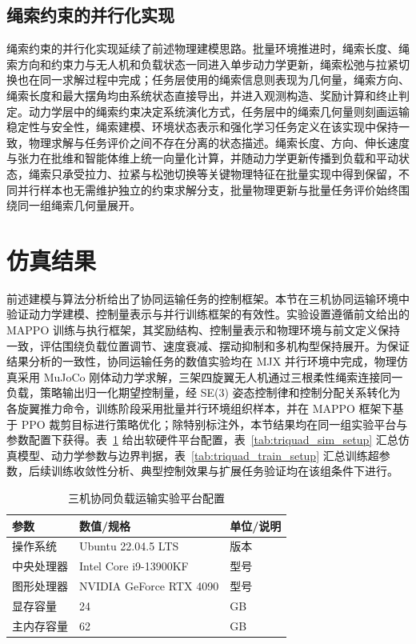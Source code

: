 \subsection{绳索约束的并行化实现}

绳索约束的并行化实现延续了前述物理建模思路。批量环境推进时，绳索长度、绳索方向和约束力与无人机和负载状态一同进入单步动力学更新，绳索松弛与拉紧切换也在同一求解过程中完成；任务层使用的绳索信息则表现为几何量，绳索方向、绳索长度和最大摆角均由系统状态直接导出，并进入观测构造、奖励计算和终止判定。动力学层中的绳索约束决定系统演化方式，任务层中的绳索几何量则刻画运输稳定性与安全性，绳索建模、环境状态表示和强化学习任务定义在该实现中保持一致，物理求解与任务评价之间不存在分离的状态描述。绳索长度、方向、伸长速度与张力在批维和智能体维上统一向量化计算，并随动力学更新传播到负载和平动状态，绳索只承受拉力、拉紧与松弛切换等关键物理特征在批量实现中得到保留，不同并行样本也无需维护独立的约束求解分支，批量物理更新与批量任务评价始终围绕同一组绳索几何量展开。


\section{仿真结果}

前述建模与算法分析给出了协同运输任务的控制框架。本节在三机协同运输环境中验证动力学建模、控制量表示与并行训练框架的有效性。实验设置遵循前文给出的 MAPPO 训练与执行框架，其奖励结构、控制量表示和物理环境与前文定义保持一致，评估围绕负载位置调节、速度衰减、摆动抑制和多机构型保持展开。为保证结果分析的一致性，协同运输任务的数值实验均在 MJX 并行环境中完成，物理仿真采用 MuJoCo 刚体动力学求解，三架四旋翼无人机通过三根柔性绳索连接同一负载，策略输出归一化期望控制量，经 SE(3) 姿态控制律和控制分配关系转化为各旋翼推力命令，训练阶段采用批量并行环境组织样本，并在 MAPPO 框架下基于 PPO 裁剪目标进行策略优化；除特别标注外，本节结果均在同一组实验平台与参数配置下获得。表~\ref{tab:triquad_platform} 给出软硬件平台配置，表~\ref{tab:triquad_sim_setup} 汇总仿真模型、动力学参数与边界判据，表~\ref{tab:triquad_train_setup} 汇总训练超参数，后续训练收敛性分析、典型控制效果与扩展任务验证均在该组条件下进行。

\begin{table}[htbp]
    \centering
    \caption{三机协同负载运输实验平台配置}
    \label{tab:triquad_platform}
    \renewcommand{\arraystretch}{1.15}
    \begin{tabular}{p{}p{}p{}}
        \toprule
        参数 & 数值/规格 & 单位/说明 \\
        \midrule
        操作系统 & Ubuntu 22.04.5 LTS & 版本\\
        中央处理器 & Intel Core i9-13900KF & 型号 \\
        图形处理器 & NVIDIA GeForce RTX 4090 & 型号 \\
        显存容量 & 24 & GB\\
        主内存容量 & 62 & GB\\
        \bottomrule
    \end{tabular}
\end{table}

